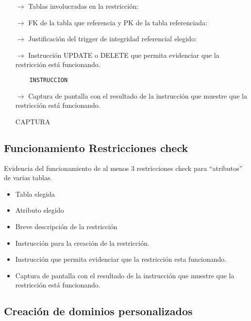 \begin{itemize}
    \item[$\rightarrow$] Tablas involucradas en la restricción: 
    \item[$\rightarrow$] FK de la tabla que referencia y PK de la tabla referenciada: 
    \item[$\rightarrow$] Justificación del trigger de integridad referencial elegido: 
    \item[$\rightarrow$] Instrucción UPDATE o DELETE que permita evidenciar que la restricción está
    funcionando.
    \begin{verbatim}
    INSTRUCCION
    \end{verbatim}
    \item[$\rightarrow$] Captura de pantalla con el resultado de la instrucción que muestre que la restricción está
    funcionando.
    \begin{center}
        CAPTURA
    \end{center}
\end{itemize}


\subsection{Funcionamiento Restricciones check}

Evidencia del funcionamiento de al menos 3 restricciones check para “atributos” de varias
tablas.

\begin{itemize}
    \item Tabla elegida
    \item Atributo elegido
    \item Breve descripción de la restricción
    \item Instrucción para la creación de la restricción.
    \item Instrucción que permita evidenciar que la restricción esta funcionando.
    \item Captura de pantalla con el resultado de la instrucción que muestre que la restricción está
    funcionando.
\end{itemize}




\subsection{Creación de dominios personalizados}

